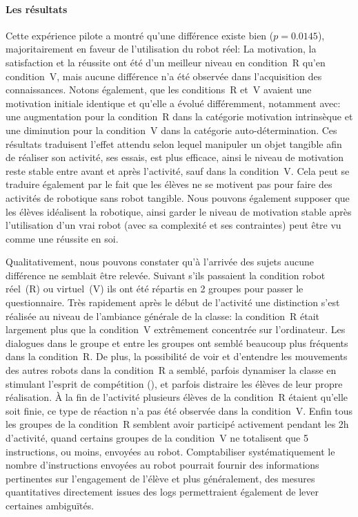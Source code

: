             \paragraph{Les résultats}
                Cette expérience pilote a montré qu'une différence existe bien ($p=0.0145$), majoritairement en faveur de l'utilisation du robot réel: La motivation, la satisfaction et la réussite ont été d'un meilleur niveau en condition~R qu'en condition~V, mais aucune différence n'a été observée dans l'acquisition des connaissances. Notons également, que les conditions~R et~V avaient une motivation initiale identique et qu'elle a évolué différemment, notamment avec: une augmentation pour la condition~R dans la catégorie motivation intrinsèque et une diminution pour la condition~V dans la catégorie auto-détermination. Ces résultats traduisent l'effet attendu selon lequel manipuler un objet tangible afin de réaliser son activité, ses essais, est plus efficace, ainsi le niveau de motivation reste stable entre avant et après l'activité, sauf dans la condition~V. Cela peut se traduire également par le fait que les élèves ne se motivent pas pour faire des activités de robotique sans robot tangible. Nous pouvons également supposer que les élèves idéalisent la robotique, ainsi garder le niveau de motivation stable après l'utilisation d'un vrai robot (avec sa complexité et ses contraintes) peut être vu comme une réussite en soi. \par%
                Qualitativement, nous pouvons constater qu'à l'arrivée des sujets aucune différence ne semblait être relevée. Suivant s'ils passaient la condition robot réel~(R) ou virtuel~(V) ils ont été répartis en 2 groupes pour passer le questionnaire. Très rapidement après le début de l'activité une distinction s'est réalisée au niveau de l'ambiance générale de la classe: la condition~R était largement plus  que la condition~V extrêmement concentrée sur l'ordinateur. Les dialogues dans le groupe et entre les groupes ont semblé beaucoup plus fréquents dans la condition~R. De plus, la possibilité de voir et d'entendre les mouvements des autres robots dans la condition~R a semblé, parfois dynamiser la classe en stimulant l'esprit de compétition (), et parfois distraire les élèves de leur propre réalisation. À la fin de l'activité plusieurs élèves de la condition~R étaient  qu'elle soit finie, ce type de réaction n'a pas été observée dans la condition~V. Enfin tous les groupes de la condition~R semblent avoir participé activement pendant les 2h d'activité, quand certains groupes de la condition~V ne totalisent que 5 instructions, ou moins, envoyées au robot. Comptabiliser systématiquement le nombre d'instructions envoyées au robot pourrait fournir des informations pertinentes sur l'engagement de l'élève et plus généralement, des mesures quantitatives directement issues des logs permettraient également de lever certaines ambiguïtés.\par%
